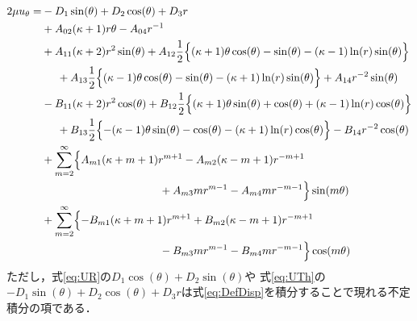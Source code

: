 \begin{align}
	2\mu u_{\theta} =&-D_{1}\sin(\theta)+D_{2}\cos(\theta)+D_{3}r
	\nonumber
	\\
	&+A_{02}(\kappa+1)r\theta
	-A_{04}r^{-1}
	\nonumber
	\\
	&+A_{11}(\kappa+2)r^2\sin(\theta)
	+A_{12}\frac{1}{2}\Bigl\{ (\kappa+1)\theta\cos(\theta) -\sin(\theta)-(\kappa-1)\ln(r)\sin(\theta) \Bigr\}
	\nonumber
	\\
	&\hspace{0.5cm}+A_{13}\frac{1}{2}\Bigl\{ (\kappa-1)\theta\cos(\theta) -\sin(\theta)-(\kappa+1)\ln(r)\sin(\theta) \Bigr\}
	+A_{14}r^{-2}\sin(\theta)
	\nonumber
	\\
	&-B_{11}(\kappa+2)r^2\cos(\theta)
	+B_{12}\frac{1}{2}\Bigl\{ (\kappa+1)\theta\sin(\theta) +\cos(\theta)+(\kappa-1)\ln(r)\cos(\theta) \Bigr\}
	\nonumber
	\\
	&\hspace{0.5cm}+B_{13}\frac{1}{2}\Bigl\{ -(\kappa-1)\theta\sin(\theta) -\cos(\theta)-(\kappa+1)\ln(r)\cos(\theta) \Bigr\}
	-B_{14}r^{-2}\cos(\theta)
	\nonumber
	\\
	&+\sum_{m=2}^{\infty}\Bigl\{A_{m1}(\kappa+m+1)r^{m+1}
	-A_{m2}(\kappa-m+1)r^{-m+1}
	\nonumber
	\\
	&\hspace{3.8cm}
	+A_{m3}mr^{m-1}
	-A_{m4}mr^{-m-1}\Bigr\}\sin(m\theta)
	\nonumber
	\\
	&+\sum_{m=2}^{\infty}\Bigl\{-B_{m1}(\kappa+m+1)r^{m+1}
	+B_{m2}(\kappa-m+1)r^{-m+1}
	\nonumber
	\\
	&\hspace{3.8cm}
	-B_{m3}mr^{m-1}
	-B_{m4}mr^{-m-1}\Bigr\}\cos(m\theta)
	\label{eq:UTh}
\end{align}
ただし，式\eqref{eq:UR}の$D_{1}\cos(\theta)+D_{2}\sin(\theta)$や
式\eqref{eq:UTh}の$-D_{1}\sin(\theta)+D_{2}\cos(\theta)+D_{3}r$は式\eqref{eq:DefDisp}を積分することで現れる不定積分の項である．
\newpage
